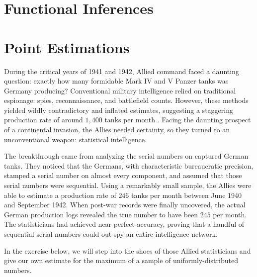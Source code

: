 \clearpage
\section{Functional Inferences}\label{exer:functional_inf}

\clearpage
\section{Point Estimations}\label{exer:point_est}

During the critical years of 1941 and 1942, Allied command faced a daunting question: exactly how many formidable Mark IV and V Panzer tanks was Germany producing? Conventional military intelligence relied on traditional espionage: spies, reconnaissance, and battlefield counts. However, these methods yielded wildly contradictory and inflated estimates, suggesting a staggering production rate of around $1,400$ tanks per month \cite{The_Guardian_2006}. Facing the daunting prospect of a continental invasion, the Allies needed certainty, so they turned to an unconventional weapon: statistical intelligence. 

The breakthrough came from analyzing the serial numbers on captured German tanks. They noticed that the Germans, with characteristic bureaucratic precision, stamped a serial number on almost every component, and assumed that those serial numbers were sequential. Using a remarkably small sample, the Allies were able to estimate a production rate of $246$ tanks per month between June 1940 and September 1942. When post-war records were finally uncovered, the actual German production logs revealed the true number to have been $245$ per month. The statisticians had achieved near-perfect accuracy, proving that a handful of sequential serial numbers could out-spy an entire intelligence network.

In the exercise below, we will step into the shoes of those Allied statisticians and give our own estimate for the maximum of a sample of uniformly-distributed numbers.

